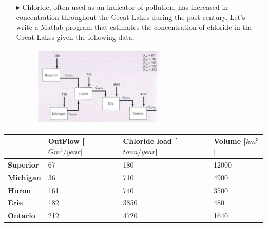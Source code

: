 \documentclass[xcolor={dvipsnames,rgb}, aspectratio=169]{beamer}
\begin{document}
\begin{frame}{}
   \begin{itemize}
      \item[$\blacktriangleright$] Chloride, often used as an indicator of pollution, has
         increased in concentration throughout the Great Lakes during the past century.
         Let's write a Matlab program that estimates the concentration of chloride in the
         Great Lakes given the following data.
         \begin{figure}
            \centering
            \includegraphics[width=0.6\textwidth]{figures/lakes.png}
         \end{figure}
   \end{itemize}
\end{frame}

\begin{frame}{}
   \begin{table}
   \centering
   \begin{tabular}{l|l|l|l}
      & \textbf{OutFlow [$Gm^{3}/year$]} & \textbf{Chloride load [$tonn/year$]} & \textbf{Volume [$km^{3}$]}  \\
      \hline
      \textbf{Superior} & 67  & 180  & 12000 \\
      \textbf{Michigan} & 36  & 710  & 4900  \\
      \textbf{Huron}    & 161 & 740  & 3500  \\
      \textbf{Erie}     & 182 & 3850 & 480   \\
      \textbf{Ontario}  & 212 & 4720 & 1640
   \end{tabular}
   \end{table}
\end{frame}
\end{document}
